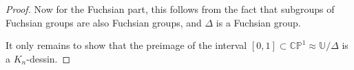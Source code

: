 \documentclass[reqno]{amsart}
\theoremstyle{definition}
\theoremstyle{remark}
\begin{document}
\begin{proof}
        Now for the Fuchsian part, 
        this follows from the fact
        that subgroups of Fuchsian groups
        are also Fuchsian groups, and
        $\Delta$ is a Fuchsian group.

        It only remains
        to show that the preimage
        of the interval
        $\left[ 0,1 \right]
        \subset \mathbb{C}\mathbb{P}^1
        \approx \mathbb{U}/ \Delta$
        is a $K_n$-dessin.

 
    
    








    
\end{proof}



\newpage
\end{document}
